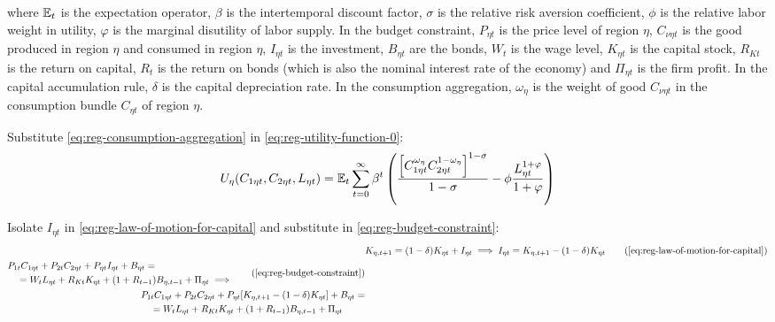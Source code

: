 \documentclass[
thesis.tex
]{subfiles}
\begin{document}
where ${\mathbb{E}_{t}}$ is the expectation operator, $\beta$ is the intertemporal discount factor, $\sigma$ is the relative risk aversion coefficient, $\phi$ is the relative labor weight in utility, $\varphi$ is the marginal disutility of labor supply. In the budget constraint, $P_{\eta t}$ is the price level of region $\eta$, $C_{\nu \eta t}$ is the good produced in region $\eta$ and consumed in region $\eta$, $I_{\eta t}$ is the investment, $B_{\eta t}$ are the bonds, $W_t$ is the wage level, $K_{\eta t}$ is the capital stock, $R_{Kt}$ is the return on capital, $R_t$ is the return on bonds (which is also the nominal interest rate of the economy) and $\Pi_{\eta t}$ is the firm profit. In the capital accumulation rule, $\delta$ is the capital depreciation rate. In the consumption aggregation, ${\omega_\eta}$ is the weight of good $C_{\nu \eta t}$ in the consumption bundle $C_{\eta t}$ of region $\eta$.

Substitute \ref{eq:reg-consumption-aggregation} in \ref{eq:reg-utility-function-0}:
\begin{align}
	U_{\eta}(C_{1\eta t}, C_{2\eta t}, L_{\eta t}) = {\mathbb{E}_{t}} \sum_{t=0}^{\infty} \beta^t \left( \frac{\left[ C_{1\eta t}^{\omega_{\eta}} C_{2\eta t}^{1-\omega_{\eta}} \right]^{1-\sigma}}{1-\sigma} - \phi \frac{L_{\eta t}^{1+\varphi}}{1+\varphi} \right) \label{eq:reg-utility-function}
\end{align}

Isolate $I_{\eta t}$ in \ref{eq:reg-law-of-motion-for-capital} and substitute in \ref{eq:reg-budget-constraint}:
\begin{align}
	& K_{\eta, t+1} = (1-\delta)K_{\eta t} + I_{\eta t} \implies I_{\eta t} = K_{\eta, t+1} - (1-\delta)K_{\eta t} \tag{\ref{eq:reg-law-of-motion-for-capital}} \\
	\begin{split}
		& P_{1t} C_{1\eta t} + P_{2t} C_{2\eta t} + P_{\eta t} I_{\eta t} + B_{\eta t} = \\ & \quad = W_t L_{\eta t} + R_{Kt} K_{\eta t} + (1 + R_{t-1}) B_{\eta,t-1} + \Pi_{\eta t} \implies
	\end{split} \tag{\ref{eq:reg-budget-constraint}}
	\\
	\begin{split}
		& P_{1t} C_{1\eta t} + P_{2t} C_{2\eta t} + P_{\eta t} [ K_{\eta, t+1} - (1-\delta)K_{\eta t} ] + B_{\eta t} = \\ & \quad = W_t L_{\eta t} + R_{Kt} K_{\eta t} + (1 + R_{t-1}) B_{\eta,t-1} + \Pi_{\eta t}
	\end{split} \label{eq:reg-budget-constraint-2}
\end{align}
\end{document}
